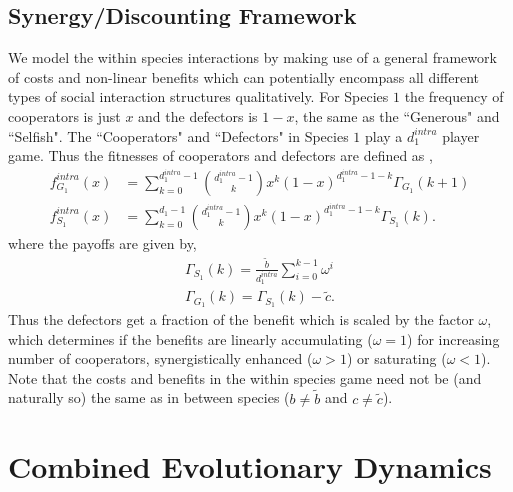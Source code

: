 \documentclass[12pt]{article}
\begin{document}
\subsection*{Synergy/Discounting Framework}
We model the within species interactions by making use of a general framework of costs and non-linear benefits \citep{eshel:AmNat:1988,hauert:JTB:2006a} which can potentially encompass all different types of social interaction structures qualitatively.
For Species $1$ the frequency of cooperators is just $x$ and the defectors is $1-x$, the same as the ``Generous" and ``Selfish".
The ``Cooperators" and ``Defectors" in Species $1$ play a $d_1^{intra}$ player game.
Thus the fitnesses of cooperators and defectors are defined as \citep{hauert:JTB:2006a},
%
\begin{align}
	f^{intra}_{G_1} (x) &= \sum_{k=0}^{d_1^{intra} -1} \binom{d_1^{intra} -1}{k}x^k (1-x)^{d_1^{intra} -1-k} \Gamma_{G_1}(k+1) \\
	f^{intra}_{S_1} (x) &= \sum_{k=0}^{d_1 -1} \binom{d_1^{intra} -1}{k}x^k (1-x)^{d_1^{intra} -1-k} \Gamma_{S_1}(k).
\label{intrafiteqs}
\end{align}
%
where the payoffs are given by,
\begin{align}
	\Gamma_{S_1} (k) = \frac{\tilde{b}}{d_1^{intra}} \sum_{i=0}^{k-1} \omega^i \\
	\Gamma_{G_1} (k) = \Gamma_{S_1} (k) - \tilde{c}.
\label{eqintragamepayoffs}
\end{align}
%
Thus the defectors get a fraction of the benefit which is scaled by the factor $\omega$, which determines if the benefits are linearly accumulating ($\omega=1$) for increasing number of cooperators, synergistically enhanced ($\omega>1$) or saturating ($\omega<1$).
Note that the costs and benefits in the within species game need not be (and naturally so) the same as in between species ($b\neq \tilde{b}$ and $c \neq \tilde{c}$).


\section*{Combined Evolutionary Dynamics}
\end{document}
